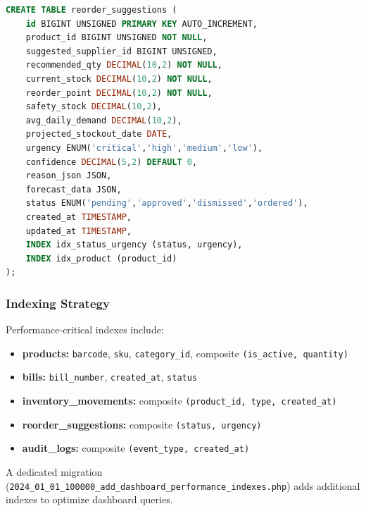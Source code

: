 \begin{lstlisting}[language=SQL]
CREATE TABLE reorder_suggestions (
    id BIGINT UNSIGNED PRIMARY KEY AUTO_INCREMENT,
    product_id BIGINT UNSIGNED NOT NULL,
    suggested_supplier_id BIGINT UNSIGNED,
    recommended_qty DECIMAL(10,2) NOT NULL,
    current_stock DECIMAL(10,2) NOT NULL,
    reorder_point DECIMAL(10,2) NOT NULL,
    safety_stock DECIMAL(10,2),
    avg_daily_demand DECIMAL(10,2),
    projected_stockout_date DATE,
    urgency ENUM('critical','high','medium','low'),
    confidence DECIMAL(5,2) DEFAULT 0,
    reason_json JSON,
    forecast_data JSON,
    status ENUM('pending','approved','dismissed','ordered'),
    created_at TIMESTAMP,
    updated_at TIMESTAMP,
    INDEX idx_status_urgency (status, urgency),
    INDEX idx_product (product_id)
);
\end{lstlisting}

\subsubsection{Indexing Strategy}

Performance-critical indexes include:

\begin{itemize}
    \item \textbf{products:} \texttt{barcode}, \texttt{sku}, \texttt{category\_id}, composite \texttt{(is\_active, quantity)}
    \item \textbf{bills:} \texttt{bill\_number}, \texttt{created\_at}, \texttt{status}
    \item \textbf{inventory\_movements:} composite \texttt{(product\_id, type, created\_at)}
    \item \textbf{reorder\_suggestions:} composite \texttt{(status, urgency)}
    \item \textbf{audit\_logs:} composite \texttt{(event\_type, created\_at)}
\end{itemize}

A dedicated migration (\texttt{2024\_01\_01\_100000\_add\_dashboard\_performance\_indexes.php}) adds additional indexes to optimize dashboard queries.
